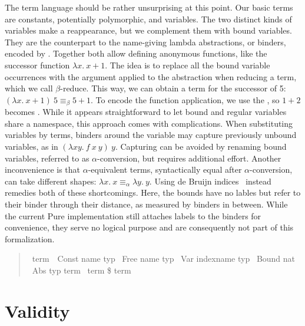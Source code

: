 The term language should be rather unsurprising at this point.
Our basic terms are constants, potentially polymorphic, and variables.
The two distinct kinds of variables make a reappearance, but we complement them with bound variables.
They are the counterpart to the name-giving lambda abstractions, or binders, encoded by .
Together both allow defining anonymous functions, like the successor function \(\lambda x.\ x + 1\).
The idea is to replace all the bound variable occurrences with the argument applied to the abstraction when reducing a term, which we call \(\beta\)-reduce.
This way, we can obtain a term for the successor of 5: \((\lambda x.\ x + 1)\ 5 \equiv_\beta 5 + 1\).
To encode the function application, we use the \isa{\$}, so \(1 + 2\) becomes .
While it appears straightforward to let bound and regular variables share a namespace, this approach comes with complications.
When substituting variables by terms, binders around the variable may capture previously unbound variables, as in \((\lambda x y.\ f\ x\ y)\ y\).
Capturing can be avoided by renaming bound variables, referred to as \(\alpha\)-conversion, but requires additional effort.
Another inconvenience is that \(\alpha\)-equivalent terms, syntactically equal after \(\alpha\)-conversion, can take different shapes: \(\lambda x.\ x \equiv_\alpha \lambda y.\ y\).
Using de Bruijn indices~\parencite{DeBruijn72} instead remedies both of these shortcomings.
Here, the bounds have no lables but refer to their binder through their distance, as measured by binders in between.
While the current Pure implementation still attaches labels to the binders for convenience, they serve no logical purpose and are consequently not part of this formalization.

\begin{quote}
    \begin{isabelle}
        \ term\ {\isacharequal}\ Const name typ\isanewline
        \isaindent{\ \ }{\isacharbar}\ Free name typ\isanewline
        \isaindent{\ \ }{\isacharbar}\ Var indexname typ\isanewline
        \isaindent{\ \ }{\isacharbar}\ Bound nat\isanewline
        \isaindent{\ \ }{\isacharbar}\ Abs typ term\isanewline
        \isaindent{\ \ }{\isacharbar}\ term \$ term
    \end{isabelle}
\end{quote}

\section{Validity}
\label{sec:validity}

